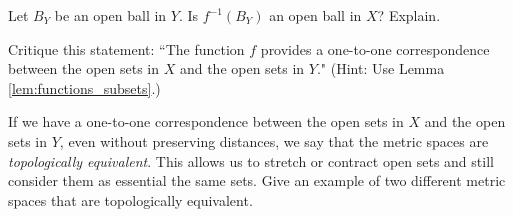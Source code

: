 \begin{pa}
	\item Let $B_Y$ be an open ball in $Y$. Is $f^{-1}(B_Y)$ an open ball in $X$? Explain.

	\item Critique this statement: ``The function $f$ provides a one-to-one correspondence between the open sets in $X$ and the open sets in $Y$." (Hint: Use Lemma \ref{lem:functions_subsets}.) 	
	
	\ea






\item If we have a one-to-one correspondence between the open sets in $X$ and the open sets in $Y$, even without preserving distances, we say that the metric spaces are \emph{topologically equivalent}. This allows us to stretch or contract open sets and still consider them as essential the same sets.  Give an example of two different metric spaces that are topologically equivalent. 

\ee

\end{pa}

